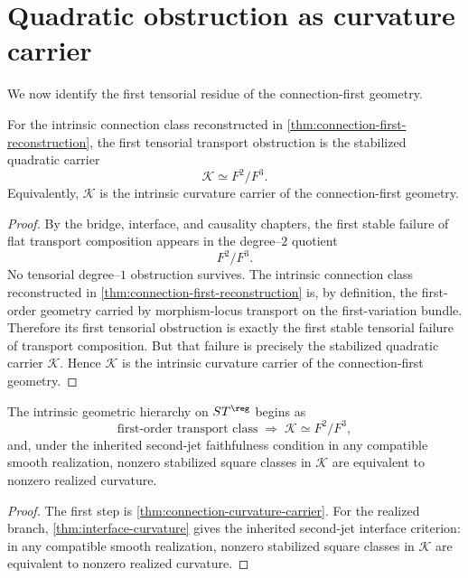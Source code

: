 \section{Quadratic obstruction as curvature carrier}
\label{sec:quadratic-obstruction-curvature}
We now identify the first tensorial residue of the connection-first
geometry.
\begin{theorem}
	\label{thm:connection-curvature-carrier}
	For the intrinsic connection class reconstructed in
	\cref{thm:connection-first-reconstruction}, the first tensorial
	transport obstruction is the stabilized quadratic carrier
	\[
		\mathcal K\simeq F^2/F^3.
	\]
	Equivalently, \(\mathcal K\) is the intrinsic curvature carrier of the
	connection-first geometry.
\end{theorem}
\begin{proof}
	By the bridge, interface, and causality chapters, the first stable
	failure of flat transport composition appears in the degree--\(2\)
	quotient
	\[
		F^2/F^3.
	\]
	No tensorial degree--\(1\) obstruction survives.
	The intrinsic connection class reconstructed in
	\cref{thm:connection-first-reconstruction} is, by definition, the
	first-order geometry carried by morphism-locus transport on the
	first-variation bundle.  Therefore its first tensorial obstruction is
	exactly the first stable tensorial failure of transport composition.
	But that failure is precisely the stabilized quadratic carrier
	\(\mathcal K\).
	Hence \(\mathcal K\) is the intrinsic curvature carrier of the
	connection-first geometry.
\end{proof}
\begin{corollary}
	The intrinsic geometric hierarchy on \(ST^{\reg}\) begins as
	\[
		\text{first-order transport class}
		\;\Longrightarrow\;
		\mathcal K\simeq F^2/F^3,
	\]
	and, under the inherited second-jet faithfulness condition in any
	compatible smooth realization, nonzero stabilized square classes in
	\(\mathcal K\) are equivalent to nonzero realized curvature.
\end{corollary}
\begin{proof}
	The first step is \cref{thm:connection-curvature-carrier}.  For the
	realized branch, \cref{thm:interface-curvature} gives the inherited
	second-jet interface criterion: in any compatible smooth realization,
	nonzero stabilized square classes in \(\mathcal K\) are equivalent to
	nonzero realized curvature.
\end{proof}
